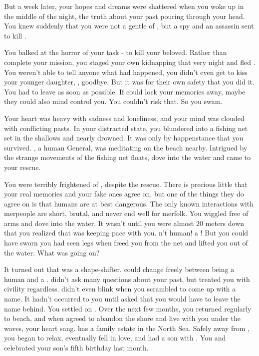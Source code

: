 \documentclass[char]{NeptuneBall}
\begin{document}
But a week later, your hopes and dreams were shattered when you woke up in the middle of the night, the truth about your past pouring through your head. You knew suddenly that you were not a gentle \cQueen{\mer} of \pAtlantis{}, but a spy and an assassin sent to kill \cKing{\King} \cKing{}.

You balked at the horror of your task - to kill your beloved. Rather than complete your mission, you staged your own kidnapping that very night and fled \pAtlantis{}. You weren't able to tell anyone what had happened, you didn't even get to kiss your younger daughter, \cPrincess{}, goodbye. But it was for their own safety that you did it. You had to leave as soon as possible. If \pAssassin{} could lock your memories away, maybe they could also mind control you. You couldn't risk that. So you swam.

Your heart was heavy with sadness and loneliness, and your mind was clouded with conflicting pasts. In your distracted state, you blundered into a fishing net set in the shallows and nearly drowned. It was only by happenstance that you survived. \cGeneral{}, a human General, was meditating on the beach nearby. Intrigued by the strange movements of the fishing net floats, \cGeneral{\they} dove into the water and came to your rescue.

You were terribly frightened of \cGeneral{\them}, despite the rescue. There is precious little that your real memories and your fake ones agree on, but one of the things they do agree on is that humans are at best dangerous. The only known interactions with merpeople are short, brutal, and never end well for merfolk. You wiggled free of \cGeneral{\their} arms and dove into the water. It wasn't until you were almost 20 meters down that you realized that \cGeneral{} was keeping pace with you. \cGeneral{\They} \cGeneral{\were}n't human! \cGeneral{\They} \cGeneral{\were} a \cGeneral{\mer}! But you could have sworn you had seen legs when \cGeneral{\they} freed you from the net and lifted you out of the water. What was going on? 

It turned out that \cGeneral{} was a shape-shifter. \cGeneral{\They} could change freely between being a human and a \cGeneral{\mer}. \cGeneral{} didn't ask many questions about your past, but treated you with civility regardless. \cGeneral{\they} didn't even blink when you scrambled to come up with a name. It hadn't occurred to you until \cGeneral{\they} asked that you would have to leave the name \cQueen{} behind. You settled on \cQueen{\MYname}. Over the next few months, you returned regularly to \cGeneral{\their} beach, and when \cGeneral{\they} agreed to abandon the shore and live with you under the waves, your heart sang.  \cGeneral{} has a family estate in the North Sea. Safely away from \pAtlantis{}, you began to relax, eventually fell in love, and had a son with \cGeneral{\them}. You and \cGeneral{} celebrated your son's fifth birthday last month. 
\end{document}
